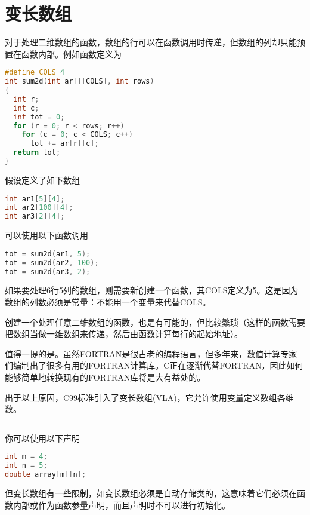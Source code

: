 \section{变长数组}
\begin{frame}[fragile]\ft{\secname}
对于处理二维数组的函数，数组的行可以在函数调用时传递，但数组的列却只能预置在函数内部。例如函数定义为
\begin{lstlisting}[language=c,backgroundcolor=\color{red!20}]
#define COLS 4
int sum2d(int ar[][COLS], int rows)
{
  int r;
  int c;
  int tot = 0;
  for (r = 0; r < rows; r++)
    for (c = 0; c < COLS; c++)
      tot += ar[r][c];
  return tot;
}
\end{lstlisting}
\end{frame}

\begin{frame}[fragile]\ft{\secname}
假设定义了如下数组
\begin{lstlisting}[language=c,backgroundcolor=\color{red!20}]
int ar1[5][4];
int ar2[100][4];
int ar3[2][4];
\end{lstlisting}
可以使用以下函数调用
\begin{lstlisting}[language=c,backgroundcolor=\color{red!20}]
tot = sum2d(ar1, 5);
tot = sum2d(ar2, 100);
tot = sum2d(ar3, 2);
\end{lstlisting}
\end{frame}

\begin{frame}[fragile]\ft{\secname}
如果要处理6行5列的数组，则需要新创建一个函数，其COLS定义为5。这是因为数组的列数必须是常量：不能用一个变量来代替COLS。
\end{frame}

\begin{frame}[fragile]\ft{\secname}
创建一个处理任意二维数组的函数，也是有可能的，但比较繁琐（这样的函数需要把数组当做一维数组来传递，然后由函数计算每行的起始地址）。
\end{frame}

\begin{frame}[fragile]\ft{\secname}
值得一提的是。虽然FORTRAN是很古老的编程语言，但多年来，数值计算专家们编制出了很多有用的FORTRAN计算库。C正在逐渐代替FORTRAN，因此如何能够简单地转换现有的FORTRAN库将是大有益处的。
\end{frame}

\begin{frame}[fragile]\ft{\secname}
出于以上原因，C99标准引入了变长数组(VLA)，它允许使用变量定义数组各维数。\pause

\rule{\textwidth}{.2mm}
 \vspace{.1mm}

你可以使用以下声明
\begin{lstlisting}[language=c,backgroundcolor=\color{red!20}]
int m = 4;
int n = 5;
double array[m][n];
\end{lstlisting}
但变长数组有一些限制，如变长数组必须是自动存储类的，这意味着它们必须在函数内部或作为函数参量声明，而且声明时不可以进行初始化。
\end{frame}

